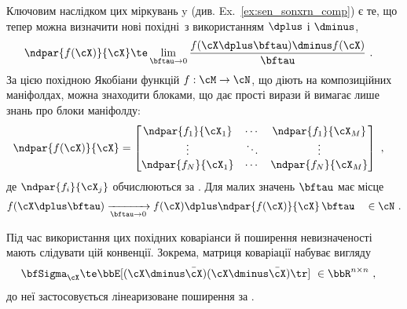 Ключовим наслідком цих міркувань
\if\examples y{ (див. Ex.~\ref{ex:sen_sonxrn_comp}) }\else { }\fi 
є те, що тепер можна визначити нові похідні\footnotemark\ з використанням $
\dplus$ і $
\dminus$,
%
\begin{align}
\ndpar{f(\cX)}{\cX} &\te \lim_{\bftau\to0}\frac{f(\cX\dplus\bftau)\dminus f(\cX)}{\bftau}
\label{equ:Jacobian_composite}
~.
\end{align}
%
За цією похідною Якобіани функцій $f:\cM\to\cN$, що діють на композиційних маніфолдах, можна знаходити блоками, що дає прості вирази й вимагає лише знань про блоки маніфолду:
%
\begin{align}
\ndpar{f(\cX)}{\cX} &= \begin{bmatrix}
\ndpar{f_1}{\cX_1} & \cdots & \ndpar{f_1}{\cX_M} \\
\vdots             & \ddots & \vdots \\
\ndpar{f_N}{\cX_1} & \cdots & \ndpar{f_N}{\cX_M} \\
\end{bmatrix}
~,
\end{align}
%
де $
\ndpar{f_i}{\cX_j}$ обчислюються за 
.
Для малих значень $
\bftau$ має місце
%
\begin{align}\label{equ:lin_approx_composite}
f(\cX\dplus\bftau) \xrightarrow[{\bftau}\to0]{} f(\cX)\dplus\ndpar{f(\cX)}{\cX}\,{\bftau}
\quad \in \cN
~.
\end{align}

Під час використання цих похідних коваріанси й поширення невизначеності мають слідувати цій конвенції. Зокрема, матриця коваріації 
 набуває вигляду
%
\begin{align}\label{equ:cov_composite}
\bfSigma_\cX &\te \bbE[(\cX \dminus \bar\cX)(\cX \dminus \bar\cX)\tr]~\in\bbR^{n\times n}
~,
\end{align}
%
до неї застосовується лінеаризоване поширення 
 за 
.

